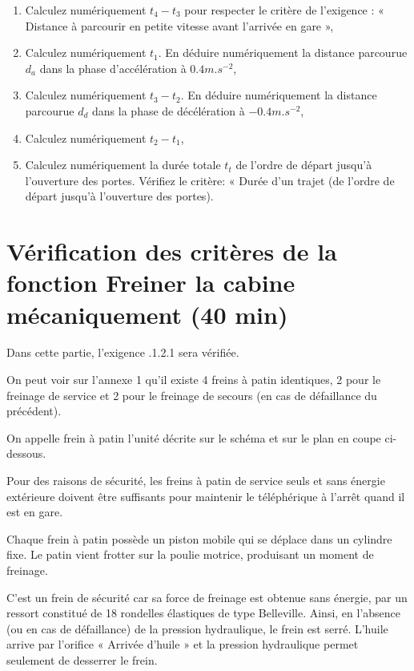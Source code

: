 \begin{enumerate}
 \item Calculez numériquement $t_4-t_3$ pour respecter le critère de l'exigence : « Distance à parcourir en petite vitesse avant l'arrivée en gare »,
 \item Calculez numériquement $t_1$. En déduire numériquement la distance parcourue $d_a$ dans la phase d'accélération à $0.4m.s^{-2}$,
 \item Calculez numériquement $t_3-t_2$. En déduire numériquement la distance parcourue $d_d$ dans la phase de décélération à $-0.4m.s^{-2}$,
 \item Calculez numériquement $t_2-t_1$,
 \item Calculez numériquement la durée totale $t_t$ de l'ordre de départ jusqu'à l'ouverture des portes. Vérifiez le critère: « Durée d'un trajet (de l'ordre de départ jusqu'à l'ouverture des portes).
\end{enumerate}

\section{Vérification des critères de la fonction \og Freiner la cabine mécaniquement \fg (40 min)}

Dans cette partie, l'exigence .1.2.1 \fg sera vérifiée.

On peut voir sur l'annexe 1 qu'il existe 4 freins à patin identiques, 2 pour le freinage de service et 2 pour le freinage de secours (en cas de défaillance du précédent).

On appelle frein à patin l'unité décrite sur le schéma et sur le plan en coupe ci-dessous.

Pour des raisons de sécurité, les freins à patin de service seuls et sans énergie extérieure doivent être suffisants pour maintenir le téléphérique à l'arrêt quand il est en gare.

Chaque frein à patin possède un piston mobile qui se déplace dans un cylindre fixe. Le patin vient frotter sur la poulie motrice, produisant un moment de freinage.

C'est un frein de sécurité car sa force de freinage est obtenue sans énergie, par un ressort constitué de 18 rondelles élastiques de type Belleville. Ainsi, en l'absence (ou en cas de défaillance) de la pression hydraulique, le frein est serré. L'huile arrive par l'orifice « Arrivée d'huile » et la pression hydraulique permet seulement de desserrer le frein.

